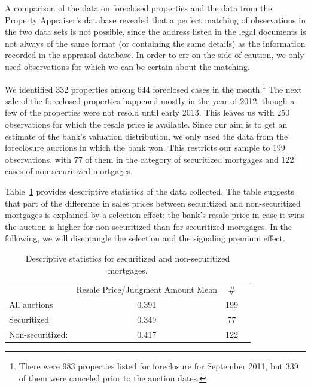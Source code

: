 \documentclass[11pt,twopage]{article}
\newcommand{\AN}[1]{\textcolor{red}{[AN: #1]}}
\begin{document}
A comparison of the data on foreclosed properties and the data from
the Property Appraiser's database revealed that a perfect matching of
observations in the two data sets is not possible, since the address
listed in the legal documents is not always of the same format (or
containing the same details) as the information recorded in the
appraisal database. In order to err on the side of caution, we only
used observations for which we can be certain about the matching.

We identified 332 properties among 644 foreclosed cases in the
month.\footnote{There were 983 properties listed for foreclosure for
  September 2011, but 339 of them were canceled prior to the auction
  dates.} The next sale of the foreclosed properties happened mostly
in the year of 2012, though a few of the properties were not resold
until early 2013. This leaves us with 250 observations for which the
resale price is available. Since our aim is to get an estimate of the
bank's valuation distribution, we only used the data from the
foreclosure auctions in which the bank won. This restricts our sample
to 199 observations, with 77 of them in the category of securitized
mortgages and 122 cases of non-securitized mortgages.

Table~\ref{tab:descriptive-securitization-resale} provides descriptive
statistics of the data collected. %
  The table suggests that part of
the difference in sales prices between securitized and non-securitized
mortgages is explained by a selection effect: the bank's resale price
in case it wins the auction is higher for non-securitized than for
securitized mortgages. In the following, we will disentangle the
selection and the signaling premium effect.

\begin{table}[!htbp]
  \centering \caption{Descriptive statistics for securitized and
    non-securitized mortgages. %
    \label{tab:descriptive-securitization-resale}}
  \begin{tabular}{lccc}
    \hline\hline
    & Resale Price/Judgment Amount Mean %
    & \#\\
    All auctions & 0.391 %
    & 199 \\
    Securitized & 0.349 %
    & 77 \\
    Non-securitized: & 0.417 %
    & 122 \\
    \hline
  \end{tabular}
\end{table}
\end{document}
